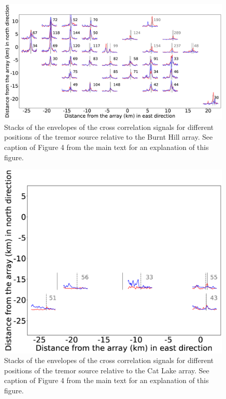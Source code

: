 \documentclass[draft]{agujournal2019}
\begin{document}
\begin{figure}
\noindent\includegraphics[width=\textwidth, trim={5cm 0.5cm 7.5cm 1.5cm},clip]{figures/BH_PWS_PWS_0.eps}
\caption{Stacks of the envelopes of the cross correlation signals for different positions of the tremor source relative to the Burnt Hill array. See caption of Figure 4 from the main text for an explanation of this figure.}
\label{pngfiguresample}
\end{figure}

\begin{figure}
\noindent\includegraphics[width=\textwidth, trim={1.5cm 1cm 4.5cm 1.5cm},clip]{figures/CL_PWS_PWS_0.eps}
\caption{Stacks of the envelopes of the cross correlation signals for different positions of the tremor source relative to the Cat Lake array. See caption of Figure 4 from the main text for an explanation of this figure.}
\label{pngfiguresample}
\end{figure}
\end{document}
